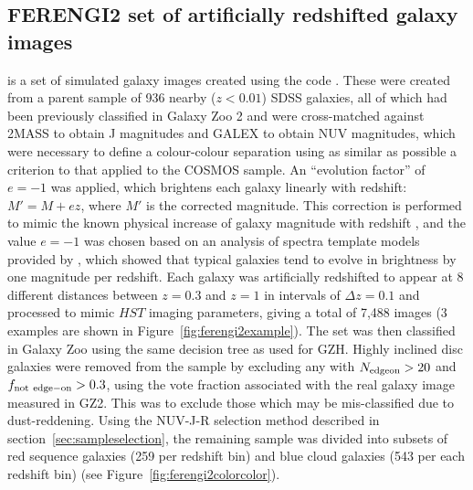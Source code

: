 \documentclass[useAMS,usenatbib]{mn2e}
\begin{document}
\subsection{FERENGI2 set of artificially redshifted galaxy images}
\label{ssec:ferengi}
 is a set of simulated galaxy images created using the \ferengi{} code \citep{Barden2008}. These were created from a parent sample of 936 nearby ($z<0.01$) SDSS galaxies, all of which had been previously classified in Galaxy Zoo 2 and were cross-matched against 2MASS \citep{Skrutskie2006} to obtain J magnitudes and GALEX \citep{Martin2005} to obtain NUV magnitudes, which were necessary to define a colour-colour separation using as similar as possible a criterion to that applied to the COSMOS sample.  An ``evolution factor'' of $e=-1$ was applied, which brightens each galaxy linearly with redshift: $M' = M + ez$, where $M'$ is the corrected magnitude. This correction is performed to mimic the known physical increase of galaxy magnitude with redshift \citep{Lilly1998,Loveday2011}, and the value $e=-1$ was chosen based on an analysis of spectra template models provided by \citet{Brinchmann2004a}, which showed that typical galaxies tend to evolve in brightness by one magnitude per redshift. Each galaxy was artificially redshifted to appear at 8 different distances between $z=0.3$ and $z=1$ in intervals of $\Delta z = 0.1$ and processed to mimic $HST$ imaging parameters, giving a total of 7,488 images (3 examples are shown in Figure~\ref{fig:ferengi2example}).  The set was then classified in Galaxy Zoo using the same decision tree as used for GZH. Highly inclined disc galaxies were removed from the sample by excluding any with $N_{\rm edgeon}>20$ and $f_{\rm not~edge-on}>0.3$, using the vote fraction associated with the real galaxy image measured in GZ2. This was to exclude those which may be mis-classified due to dust-reddening.  Using the NUV-J-R selection method described in section~\ref{sec:sampleselection}, the remaining sample was divided into subsets of red sequence galaxies (259 per redshift bin) and blue cloud galaxies (543 per each redshift bin) (see Figure~\ref{fig:ferengi2colorcolor}).
\end{document}

